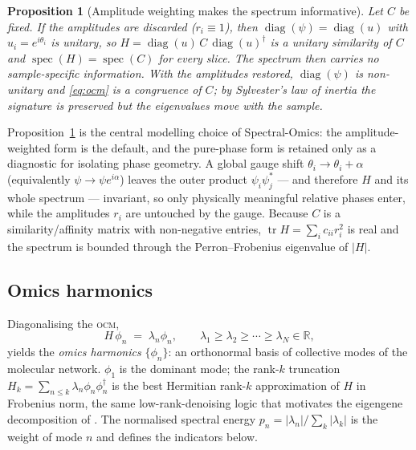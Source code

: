 \documentclass[preprint,12pt,amsmath,amssymb,superscriptaddress,floatfix]{revtex4-2}
\theoremstyle{definition}
\theoremstyle{plain}
\newtheorem{proposition}{Proposition}
\newcommand{\OCM}{\textsc{ocm}}
\begin{document}
\begin{proposition}[Amplitude weighting makes the spectrum informative]
\label{prop:amp}
Let $C$ be fixed. If the amplitudes are discarded ($r_i\equiv1$), then
$\operatorname{diag}(\psi)=\operatorname{diag}(u)$ with $u_i=e^{i\theta_i}$ is
\emph{unitary}, so $H=\operatorname{diag}(u)\,C\,\operatorname{diag}(u)^{\dagger}$
is a unitary similarity of $C$ and $\operatorname{spec}(H)=\operatorname{spec}(C)$
for every slice. The spectrum then carries no sample-specific information. With
the amplitudes restored, $\operatorname{diag}(\psi)$ is non-unitary and
\cref{eq:ocm} is a \emph{congruence} of $C$; by Sylvester's law of inertia the
signature is preserved but the eigenvalues move with the sample.
\end{proposition}

\noindent Proposition~\ref{prop:amp} is the central modelling choice of
Spectral-Omics: the amplitude-weighted form is the default, and the pure-phase
form is retained only as a diagnostic for isolating phase geometry. A global
gauge shift $\theta_i\to\theta_i+\alpha$ (equivalently $\psi\to\psi e^{i\alpha}$)
leaves the outer product $\psi_i\psi_j^{*}$ --- and therefore $H$ and its whole
spectrum --- invariant, so only physically meaningful relative phases enter,
while the amplitudes $r_i$ are untouched by the gauge. Because $C$ is a
similarity/affinity matrix with non-negative entries, $\operatorname{tr}H =
\sum_i c_{ii}r_i^2$ is real and the spectrum is bounded through the
Perron--Frobenius eigenvalue of $|H|$.



\subsection{Omics harmonics}
\label{sec:theory-harmonics}

Diagonalising the \OCM,
\begin{equation}
  H\,\phi_n \;=\; \lambda_n \phi_n,\qquad
  \lambda_1\ge\lambda_2\ge\cdots\ge\lambda_N \in\mathbb{R},
  \label{eq:harmonics}
\end{equation}
yields the \emph{omics harmonics} $\{\phi_n\}$: an orthonormal basis of
collective modes of the molecular network. $\phi_1$ is the dominant mode; the
rank-$k$ truncation $H_k = \sum_{n\le k}\lambda_n\phi_n\phi_n^{\dagger}$ is the
best Hermitian rank-$k$ approximation of $H$ in Frobenius norm, the same
low-rank-denoising logic that motivates the eigengene decomposition of
\citet{alter2000svd}. The normalised spectral energy
$p_n = |\lambda_n|/\sum_k|\lambda_k|$ is the weight of mode $n$ and defines the
indicators below.
\end{document}
